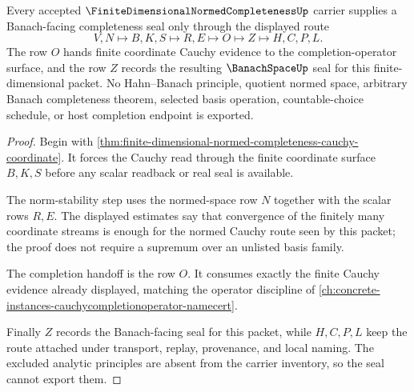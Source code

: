 \begin{theorem}
\label{thm:finite-dimensional-normed-completeness-banach-seal}
Every accepted $\FiniteDimensionalNormedCompletenessUp$ carrier supplies a Banach-facing completeness seal only through the displayed route
$$
V,N \longmapsto B,K,S \longmapsto R,E \longmapsto O \longmapsto Z \longmapsto H,C,P,L .
$$
The row $O$ hands finite coordinate Cauchy evidence to the completion-operator surface, and the row $Z$ records the resulting $\BanachSpaceUp$ seal for this finite-dimensional packet. No Hahn--Banach principle, quotient normed space, arbitrary Banach completeness theorem, selected basis operation, countable-choice schedule, or host completion endpoint is exported.
\end{theorem}
\begin{proof}
Begin with \autoref{thm:finite-dimensional-normed-completeness-cauchy-coordinate}. It forces the Cauchy read through the finite coordinate surface $B,K,S$ before any scalar readback or real seal is available.

The norm-stability step uses the normed-space row $N$ together with the scalar rows $R,E$. The displayed estimates say that convergence of the finitely many coordinate streams is enough for the normed Cauchy route seen by this packet; the proof does not require a supremum over an unlisted basis family.

The completion handoff is the row $O$. It consumes exactly the finite Cauchy evidence already displayed, matching the operator discipline of \autoref{ch:concrete-instances-cauchycompletionoperator-namecert}.

Finally $Z$ records the Banach-facing seal for this packet, while $H,C,P,L$ keep the route attached under transport, replay, provenance, and local naming. The excluded analytic principles are absent from the carrier inventory, so the seal cannot export them.
\end{proof}



